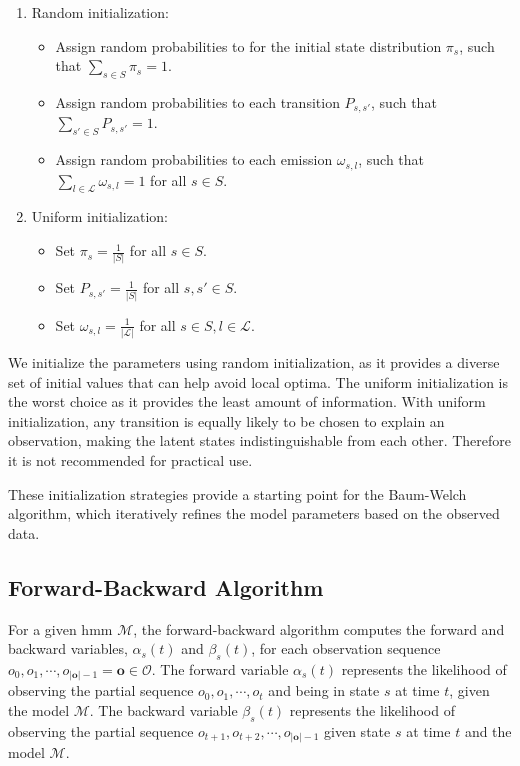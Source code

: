 \begin{enumerate}
    \item Random initialization: 
    \begin{itemize}
        \item Assign random probabilities to for the initial state distribution $\pi_s$, such that $\sum_{s \in S} \pi_s = 1$.
        \item Assign random probabilities to each transition $P_{s, s'}$, such that $\sum_{s' \in S} P_{s, s'} = 1$.
        \item Assign random probabilities to each emission $\omega_{s, l}$, such that $\sum_{l \in \mathcal{L}} \omega_{s, l} = 1$ for all $s \in S$.
    \end{itemize}
    \item Uniform initialization: 
    \begin{itemize}
        \item Set $\pi_s = \frac{1}{|S|}$ for all $s \in S$.
        \item Set $P_{s, s'} = \frac{1}{|S|}$ for all $s, s' \in S$.
        \item Set $\omega_{s, l} = \frac{1}{|\mathcal{L}|}$ for all $s \in S, l \in \mathcal{L}$.
    \end{itemize}
\end{enumerate}

We initialize the parameters using random initialization, as it provides a diverse set of initial values that can help avoid local optima.
The uniform initialization is the worst choice as it provides the least amount of information. 
With uniform initialization, any transition is equally likely to be chosen to explain an observation, making the latent states indistinguishable from each other. 
Therefore it is not recommended for practical use.

These initialization strategies provide a starting point for the Baum-Welch algorithm, which iteratively refines the model parameters based on the observed data.

\subsection{Forward-Backward Algorithm}\label{subsec:forward-backwards_algorithm}
For a given \gls{hmm} $\mathcal{M}$, the forward-backward algorithm computes the forward and backward variables, $\alpha_s(t)$ and $\beta_s(t)$, for each observation sequence $o_0, o_1, \cdots, o_{|\mathbf{o}|-1} = \mathbf{o} \in \mathcal{O}$.
The forward variable $\alpha_s(t)$ represents the likelihood of observing the partial sequence $o_0, o_1, \cdots, o_t$ and being in state $s$ at time $t$, given the model $\mathcal{M}$.
The backward variable $\beta_s(t)$ represents the likelihood of observing the partial sequence $o_{t+1}, o_{t+2}, \cdots, o_{|\mathbf{o}|-1}$ given state $s$ at time $t$ and the model $\mathcal{M}$.

